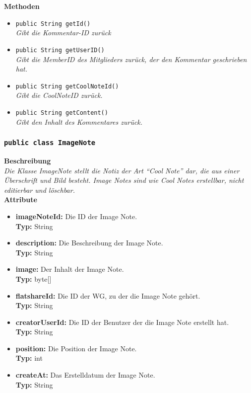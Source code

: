 	\textbf{Methoden}
	\begin{itemize}
		\item\texttt{public String getId()}\\
		\textit{Gibt die Kommentar-ID zurück}\\
		
		\item\texttt{{public String getUserID()}}\\
		\textit{Gibt die MemberID des Mitglieders zurück, der den Kommentar geschrieben hat.}\\
		
		\item\texttt{{public String getCoolNoteId()}}\\
		\textit{Gibt die CoolNoteID zurück.}\\
		
		\item\texttt{{public String getContent()}}\\
		\textit{Gibt den Inhalt des Kommentares zurück.}\\
	\end{itemize}

\subsubsection{\texttt{public class ImageNote}}

	\textbf{Beschreibung} \\
	\textit{Die Klasse ImageNote stellt die Notiz der Art “Cool Note” dar, die aus einer Überschrift und Bild besteht. Image Notes sind wie Cool Notes erstellbar, nicht editierbar und löschbar.} \\
	
	\textbf{Attribute}
	\begin{itemize}
		\item \textbf{imageNoteId:} Die ID der Image Note. \\
		\textbf{Typ:} String
		\item \textbf{description:} Die Beschreibung der Image Note. \\
		\textbf{Typ:} String
		\item \textbf{image:} Der Inhalt der Image Note. \\
		\textbf{Typ:} byte[]
		\item \textbf{flatshareId:} Die ID der WG, zu der die Image Note gehört. \\
		\textbf{Typ:} String
		\item \textbf{creatorUserId:} Die ID der Benutzer der die Image Note erstellt hat. \\
		\textbf{Typ:} String
		\item \textbf{position:} Die Position der Image Note. \\
		\textbf{Typ:} int
		\item \textbf{createAt:} Das Erstelldatum der Image Note.\\
		\textbf{Typ:} String
	\end{itemize}
	
